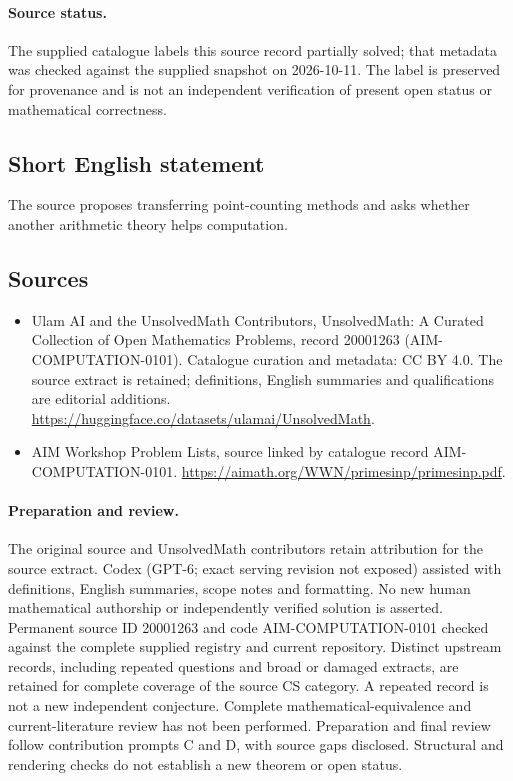 \documentclass[11pt]{article}
\begin{document}
\paragraph{Source status.}
The supplied catalogue labels this source record partially solved; that metadata was checked against the supplied snapshot on 2026-10-11. The label is preserved for provenance and is not an independent verification of present open status or mathematical correctness.
\subsection{Short English statement}
The source proposes transferring point-counting methods and asks whether another arithmetic theory helps computation.
\subsection{Sources}
\begin{itemize}
\item[\hypertarget{source:20001263:1}{S1}] Ulam AI and the UnsolvedMath Contributors, UnsolvedMath: A Curated Collection of Open Mathematics Problems, record 20001263 (AIM-COMPUTATION-0101). Catalogue curation and metadata: CC BY 4.0. The source extract is retained; definitions, English summaries and qualifications are editorial additions.
\url{https://huggingface.co/datasets/ulamai/UnsolvedMath}.
\item[\hypertarget{source:20001263:2}{S2}] AIM Workshop Problem Lists, source linked by catalogue record AIM-COMPUTATION-0101.
\url{https://aimath.org/WWN/primesinp/primesinp.pdf}.
\end{itemize}
\paragraph{Preparation and review.}
The original source and UnsolvedMath contributors retain attribution for the source extract. Codex (GPT-6; exact serving revision not exposed) assisted with definitions, English summaries, scope notes and formatting. No new human mathematical authorship or independently verified solution is asserted. Permanent source ID 20001263 and code AIM-COMPUTATION-0101 checked against the complete supplied registry and current repository. Distinct upstream records, including repeated questions and broad or damaged extracts, are retained for complete coverage of the source CS category. A repeated record is not a new independent conjecture. Complete mathematical-equivalence and current-literature review has not been performed. Preparation and final review follow contribution prompts C and D, with source gaps disclosed. Structural and rendering checks do not establish a new theorem or open status.
\label{end:20001263}
\end{document}
